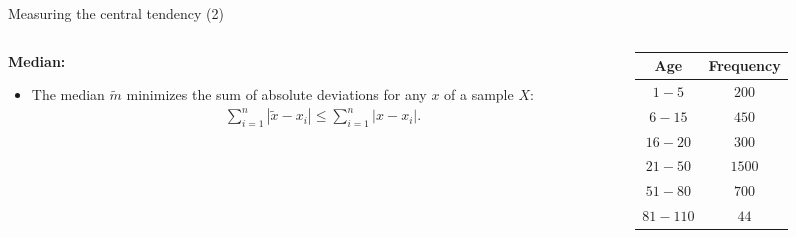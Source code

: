 \documentclass[aspectratio=169,t]{beamer}
\begin{document}
  { 
    \begin{frame}{Measuring the central tendency (2)}
      \begin{columns}
        \begin{column}{0.6\textwidth}
          \textbf{Median:}
          \begin{itemize}[noitemsep]
            \item The median $\tilde{m}$ minimizes the sum of absolute deviations for any $x$ of a sample $X$:
            \begin{align}
              \sum_{i=1}^{n} |\tilde{x}-x_i| \leq \sum_{i=1}^{n} |x-x_i|.
            \end{align}
          \end{itemize}
        \end{column}
        \begin{column}{0.3\textwidth}  %
        \begin{table}
        \begin{tabular}{|c|c|}
          Age & Frequency \\ \hline
          $1-5$ & $200$ \\
          $6-15$ & $450$ \\
          $16-20$ & $300$ \\
          $21-50$ & $1500$ \\
          $51-80$ & $700$ \\
          $81-110$ & $44$
        \end{tabular}\\[0.5cm]
        \end{table}
        \end{column}
      \end{columns}
    \end{frame}
  }
\end{document}
